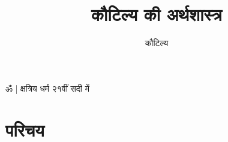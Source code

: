 \documentclass[oneside,11pt]{memoir} %
\title{कौटिल्य की अर्थशास्त्र} %
\author{कौटिल्य} %
\newcommand{\edition}{नयी टाइपिंग} %
\begin{document}

\thispagestyle{empty} %

ॐ | क्षत्रिय धर्म २१वीं सदी में

\newpage %


\tableofcontents %


\chapter*{परिचय} %
\end{document}
